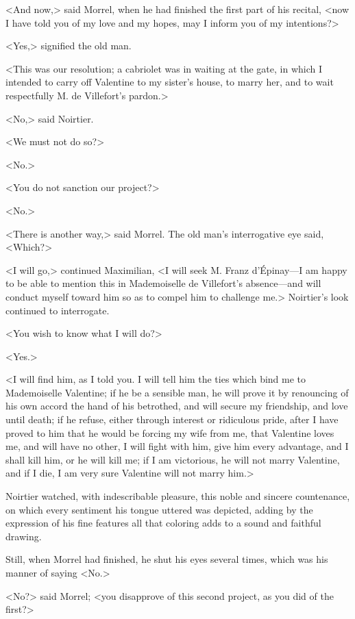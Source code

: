  <And now,> said Morrel, when he had finished the first part of his recital, <now I have told you of my love and my hopes, may I inform you of my intentions?> 

 <Yes,> signified the old man. 

 <This was our resolution; a cabriolet was in waiting at the gate, in which I intended to carry off Valentine to my sister's house, to marry her, and to wait respectfully M. de Villefort's pardon.> 

 <No,> said Noirtier. 

 <We must not do so?> 

 <No.> 

 <You do not sanction our project?> 

 <No.> 

 <There is another way,> said Morrel. The old man's interrogative eye said, <Which?> 

 <I will go,> continued Maximilian, <I will seek M. Franz d'Épinay—I am happy to be able to mention this in Mademoiselle de Villefort's absence—and will conduct myself toward him so as to compel him to challenge me.> Noirtier's look continued to interrogate. 

 <You wish to know what I will do?> 

 <Yes.> 

 <I will find him, as I told you. I will tell him the ties which bind me to Mademoiselle Valentine; if he be a sensible man, he will prove it by renouncing of his own accord the hand of his betrothed, and will secure my friendship, and love until death; if he refuse, either through interest or ridiculous pride, after I have proved to him that he would be forcing my wife from me, that Valentine loves me, and will have no other, I will fight with him, give him every advantage, and I shall kill him, or he will kill me; if I am victorious, he will not marry Valentine, and if I die, I am very sure Valentine will not marry him.> 

 Noirtier watched, with indescribable pleasure, this noble and sincere countenance, on which every sentiment his tongue uttered was depicted, adding by the expression of his fine features all that coloring adds to a sound and faithful drawing. 

 Still, when Morrel had finished, he shut his eyes several times, which was his manner of saying <No.> 

 <No?> said Morrel; <you disapprove of this second project, as you did of the first?> 


